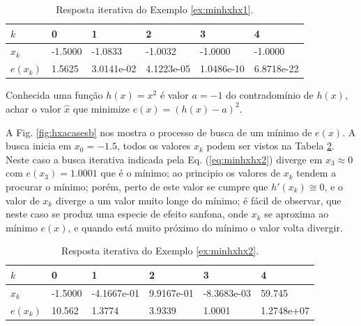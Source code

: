 \begin{table}[!h]
\centering
\begin{tabular}{|l|l|l|l|l|l|}
\hline
$k$      & 0 & 1 & 2 & 3 & 4 \\ \hline
$x_k$    & -1.5000 & -1.0833 & -1.0032 & -1.0000 & -1.0000 \\ \hline
$e(x_k)$ & 1.5625 & 3.0141e-02 & 4.1223e-05 & 1.0486e-10 & 6.8718e-22 \\ \hline
\end{tabular}
\caption{Resposta iterativa do Exemplo \ref{ex:minhxhx1}.}
\label{tab:hxacases1}
\end{table}

\begin{example}\label{ex:minhxhx2}
Conhecida uma função $h(x)=x^2$ é valor $a=-1$ do contradomínio de $h(x)$,
achar o valor $\hat{x}$ que minimize $e(x)=(h(x)-a)^2$.
\end{example}


\begin{SolutionT}\label{sol:minhxhx2}
A Fig. \ref{fig:hxacasesb} nos mostra o processo de busca de um mínimo de $e(x)$. 
A busca inicia em $x_0=-1.5$,
 todos os valores $x_{k}$ podem ser vistos na Tabela \ref{tab:hxacases2}. 
Neste caso a busca iterativa indicada pela Eq. (\ref{eq:minhxhx2}) diverge 
em $x_3\approx 0$ com $e(x_3)=1.0001$ que é o mínimo;
ao principio os valores de $x_{k}$ tendem a procurar o mínimo; porém,
perto de este valor se cumpre que $h'(x_{k})\cong 0$, e o valor de $x_{k}$ diverge
a um valor muito longe do mínimo; é fácil de observar, que neste caso se produz 
uma especie de efeito sanfona, onde $x_{k}$ se aproxima ao mínimo $e(x)$, e quando 
está muito próximo do mínimo o valor volta divergir.
\end{SolutionT}

\begin{table}[!h]
\centering
\begin{tabular}{|l|l|l|l|l|l|}
\hline
$k$      & 0 & 1 & 2 & 3 & 4 \\ \hline
$x_k$    & -1.5000 & -4.1667e-01 & 9.9167e-01 & -8.3683e-03 & 59.745 \\ \hline
$e(x_k)$ & 10.562 & 1.3774 & 3.9339 & 1.0001 & 1.2748e+07 \\ \hline
\end{tabular}
\caption{Resposta iterativa do Exemplo \ref{ex:minhxhx2}.}
\label{tab:hxacases2}
\end{table}

